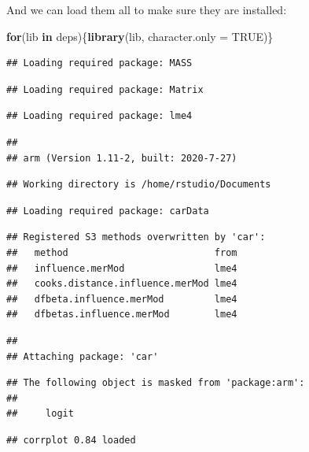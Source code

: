 \documentclass[
]{book}
\newenvironment{Shaded}{\begin{snugshade}}{\end{snugshade}}
\newcommand{\ControlFlowTok}[1]{\textcolor[rgb]{0.13,0.29,0.53}{\textbf{#1}}}
\newcommand{\DataTypeTok}[1]{\textcolor[rgb]{0.13,0.29,0.53}{#1}}
\newcommand{\KeywordTok}[1]{\textcolor[rgb]{0.13,0.29,0.53}{\textbf{#1}}}
\newcommand{\NormalTok}[1]{#1}
\newcommand{\OtherTok}[1]{\textcolor[rgb]{0.56,0.35,0.01}{#1}}
\begin{document}
And we can load them all to make sure they are installed:

\begin{Shaded}
\begin{Highlighting}[]
\ControlFlowTok{for}\NormalTok{(lib }\ControlFlowTok{in}\NormalTok{ deps)\{}\KeywordTok{library}\NormalTok{(lib, }\DataTypeTok{character.only =} \OtherTok{TRUE}\NormalTok{)\}}
\end{Highlighting}
\end{Shaded}

\begin{verbatim}
## Loading required package: MASS
\end{verbatim}

\begin{verbatim}
## Loading required package: Matrix
\end{verbatim}

\begin{verbatim}
## Loading required package: lme4
\end{verbatim}

\begin{verbatim}
## 
## arm (Version 1.11-2, built: 2020-7-27)
\end{verbatim}

\begin{verbatim}
## Working directory is /home/rstudio/Documents
\end{verbatim}

\begin{verbatim}
## Loading required package: carData
\end{verbatim}

\begin{verbatim}
## Registered S3 methods overwritten by 'car':
##   method                          from
##   influence.merMod                lme4
##   cooks.distance.influence.merMod lme4
##   dfbeta.influence.merMod         lme4
##   dfbetas.influence.merMod        lme4
\end{verbatim}

\begin{verbatim}
## 
## Attaching package: 'car'
\end{verbatim}

\begin{verbatim}
## The following object is masked from 'package:arm':
## 
##     logit
\end{verbatim}

\begin{verbatim}
## corrplot 0.84 loaded
\end{verbatim}
\end{document}
